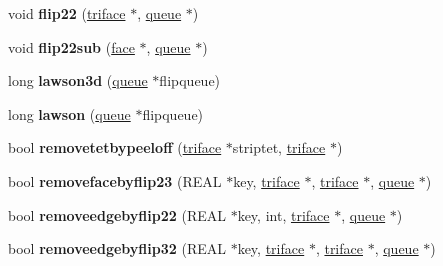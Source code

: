 \begin{DoxyCompactItemize}
\item 
\hypertarget{classtetgenmesh_a65deb5d576c1f87ba0f8803c489b459f}{void {\bfseries flip22} (\hyperlink{classtetgenmesh_1_1triface}{triface} $\ast$, \hyperlink{classtetgenmesh_1_1queue}{queue} $\ast$)}\label{classtetgenmesh_a65deb5d576c1f87ba0f8803c489b459f}

\item 
\hypertarget{classtetgenmesh_a7b05b434167a57110076c295dd7e8b78}{void {\bfseries flip22sub} (\hyperlink{classtetgenmesh_1_1face}{face} $\ast$, \hyperlink{classtetgenmesh_1_1queue}{queue} $\ast$)}\label{classtetgenmesh_a7b05b434167a57110076c295dd7e8b78}

\item 
\hypertarget{classtetgenmesh_aa3f628c8b0bd1d730b4bbebce28d83a5}{long {\bfseries lawson3d} (\hyperlink{classtetgenmesh_1_1queue}{queue} $\ast$flipqueue)}\label{classtetgenmesh_aa3f628c8b0bd1d730b4bbebce28d83a5}

\item 
\hypertarget{classtetgenmesh_ae87a9315bcb6e2b3e497ba46d51353c7}{long {\bfseries lawson} (\hyperlink{classtetgenmesh_1_1queue}{queue} $\ast$flipqueue)}\label{classtetgenmesh_ae87a9315bcb6e2b3e497ba46d51353c7}

\item 
\hypertarget{classtetgenmesh_a6148320aa5b9fbac3d36f84646be9263}{bool {\bfseries removetetbypeeloff} (\hyperlink{classtetgenmesh_1_1triface}{triface} $\ast$striptet, \hyperlink{classtetgenmesh_1_1triface}{triface} $\ast$)}\label{classtetgenmesh_a6148320aa5b9fbac3d36f84646be9263}

\item 
\hypertarget{classtetgenmesh_adc145506261fec831d8a67444642bc9b}{bool {\bfseries removefacebyflip23} (R\-E\-A\-L $\ast$key, \hyperlink{classtetgenmesh_1_1triface}{triface} $\ast$, \hyperlink{classtetgenmesh_1_1triface}{triface} $\ast$, \hyperlink{classtetgenmesh_1_1queue}{queue} $\ast$)}\label{classtetgenmesh_adc145506261fec831d8a67444642bc9b}

\item 
\hypertarget{classtetgenmesh_a8accfe8dd53c302b0125d692e7e2cf0f}{bool {\bfseries removeedgebyflip22} (R\-E\-A\-L $\ast$key, int, \hyperlink{classtetgenmesh_1_1triface}{triface} $\ast$, \hyperlink{classtetgenmesh_1_1queue}{queue} $\ast$)}\label{classtetgenmesh_a8accfe8dd53c302b0125d692e7e2cf0f}

\item 
\hypertarget{classtetgenmesh_a49bd787e3184f660f9afcbf818360a0b}{bool {\bfseries removeedgebyflip32} (R\-E\-A\-L $\ast$key, \hyperlink{classtetgenmesh_1_1triface}{triface} $\ast$, \hyperlink{classtetgenmesh_1_1triface}{triface} $\ast$, \hyperlink{classtetgenmesh_1_1queue}{queue} $\ast$)}\label{classtetgenmesh_a49bd787e3184f660f9afcbf818360a0b}


\end{DoxyCompactItemize}
